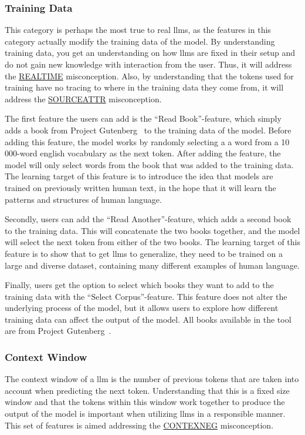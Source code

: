 \subsubsection*{Training Data}
This category is perhaps the most true to real \gls{llms}, as the features in this category actually modify the training data of the model. By understanding training data, you get an understanding on how \gls{llms} are fixed in their setup and do not gain new knowledge with interaction from the user. Thus, it will address the \hyperref[realtime]{REALTIME} misconception. Also, by understanding that the tokens used for training have no tracing to where in the training data they come from, it will address the \hyperref[sourceattr]{SOURCEATTR} misconception.

The first feature the users can add is the ``Read Book''-feature, which simply adds a book from Project Gutenberg~\cite{gutenberg} to the training data of the model. Before adding this feature, the model works by randomly selecting a a word from a 10 000-word english vocabulary as the next token. After adding the feature, the model will only select words from the book that was added to the training data. The learning target of this feature is to introduce the idea that models are trained on previously written human text, in the hope that it will learn the patterns and structures of human language. 

Secondly, users can add the ``Read Another''-feature, which adds a second book to the training data. This will concatenate the two books together, and the model will select the next token from either of the two books. The learning target of this feature is to show that to get \gls{llms} to generalize, they need to be trained on a large and diverse dataset, containing many different examples of human language. 

Finally, users get the option to select which books they want to add to the training data with the ``Select Corpus''-feature. This feature does not alter the underlying process of the model, but it allows users to explore how different training data can affect the output of the model. All books available in the tool are from Project Gutenberg~\cite{gutenberg}.

\subsubsection*{Context Window}
The context window of a \gls{llm} is the number of previous tokens that are taken into account when predicting the next token. Understanding that this is a fixed size window and that the tokens within this window work together to produce the output of the model is important when utilizing \gls{llms} in a responsible manner. This set of features is aimed addressing the \hyperref[contexneg]{CONTEXNEG} misconception.

